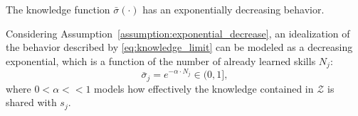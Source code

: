 \begin{tcolorbox}
	\begin{assumption}\label{assumption:exponential_decrease} The knowledge function $\bar{\sigma}(\cdot)$ has an exponentially decreasing behavior.
	\end{assumption}
\end{tcolorbox} 
Considering Assumption~\ref{assumption:exponential_decrease}, an idealization of the behavior described by \eqref{eq:knowledge_limit} can be modeled as a decreasing exponential, which is a function of the number of already learned skills $N_j$:%
\begin{equation}\label{eq:incremental_knowledge}
  \bar{\sigma}_j = e^{-\alpha  \cdot N_{j}} \in (0,1],
\end{equation}
where $ 0<\alpha<<1$ models how effectively the knowledge contained in $\mathcal{Z}$ is shared with $s_j$.

